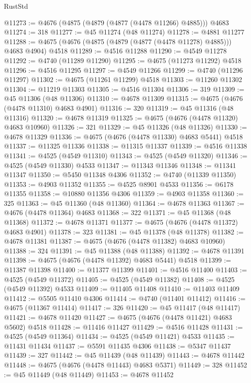 \begin{lexlean}{RustStd}
\begin{coremodule}
@11273 := @4676 (@4875 (@4879 (@4877 (@4478 @11266) @4885))) @4683
@11274 := 318
@11277 := @45 @11274 (@48 @11274)
@11278 := @4881 @11277
@11288 := @4675 (@4676 (@4875 (@4879 (@4877 (@4478 @11278) @4885))) @4683 @4904) @4518
@11289 := @4516 @11288
@11290 := @4549 @11278
@11292 := @4740 (@11289 @11290)
@11295 := @4675 (@11273 @11292) @4518
@11296 := @4516 @11295
@11297 := @4549 @11266
@11299 := @4740 (@11296 @11297)
@11302 := @4675 (@11261 @11299) @4518
@11303 := @11260 @11302
@11304 := @11219 @11303
@11305 := @4516 @11304
@11306 := 319
@11309 := @45 @11306 (@48 @11306)
@11310 := @4678 @11309
@11315 := @4675 (@4676 (@4478 @11310) @4683 @4901)
@11316 := 320
@11319 := @45 @11316 (@48 @11316)
@11320 := @4678 @11319
@11325 := @4675 (@4676 (@4478 @11320) @4683 @10960)
@11326 := 321
@11329 := @45 @11326 (@48 @11326)
@11330 := @4678 @11329
@11336 := @4675 (@4676 (@4478 @11330) @4683 @5441) @4518
@11337 := @11325 @11336
@11338 := @11315 @11337
@11339 := @4516 @11338
@11341 := @4525 (@4549 @11310)
@11343 := @4525 (@4549 @11320)
@11346 := @4525 (@4549 @11330) @4533
@11347 := @11343 @11346
@11348 := @11341 @11347
@11350 := @5450 @11348 @4306
@11352 := @4740 (@11339 @11350)
@11353 := @4903 @11352
@11355 := @4525 @8901 @4533
@11356 := @6178 @11355
@11358 := @10880 @11356 @4306
@11359 := @4903 @11358
@11360 := 325
@11363 := @45 @11360 (@48 @11360)
@11364 := @4678 @11363
@11367 := @4676 (@4478 @11364) @4683
@11368 := 322
@11371 := @45 @11368 (@48 @11368)
@11372 := @4678 @11371
@11377 := @4675 (@4676 (@4478 @11372) @4683 @4901)
@11378 := 323
@11381 := @45 @11378 (@48 @11378)
@11382 := @4678 @11381
@11387 := @4675 (@4676 (@4478 @11382) @4683 @10960)
@11388 := 324
@11391 := @45 @11388 (@48 @11388)
@11392 := @4678 @11391
@11398 := @4675 (@4676 (@4478 @11392) @4683 @5441) @4518
@11399 := @11387 @11398
@11400 := @11377 @11399
@11401 := @4516 @11400
@11403 := @4525 (@4549 @11372)
@11405 := @4525 (@4549 @11382)
@11408 := @4525 (@4549 @11392) @4533
@11409 := @11405 @11408
@11410 := @11403 @11409
@11412 := @5505 @11410 @4306
@11414 := @4740 (@11401 @11412)
@11416 := @4675 (@11367 @11414)
@11417 := 326
@11420 := @45 @11417 (@48 @11417)
@11421 := @4678 @11420
@11427 := @4675 (@4676 (@4478 @11421) @4683 @5602) @4518
@11428 := @11416 @11427
@11429 := @4516 @11428
@11431 := @4525 (@4549 @11364)
@11434 := @4525 (@4549 @11421) @4533
@11435 := @11431 @11434
@11437 := @5591 @11435 @4306
@11438 := @5347 @11437
@11439 := 327
@11442 := @45 @11439 (@48 @11439)
@11443 := @4678 @11442
@11448 := @4675 (@4676 (@4478 @11443) @4683 @5371)
@11449 := 328
@11452 := @45 @11449 (@48 @11449)
@11453 := @4678 @11452

\end{coremodule}
\end{lexlean}
